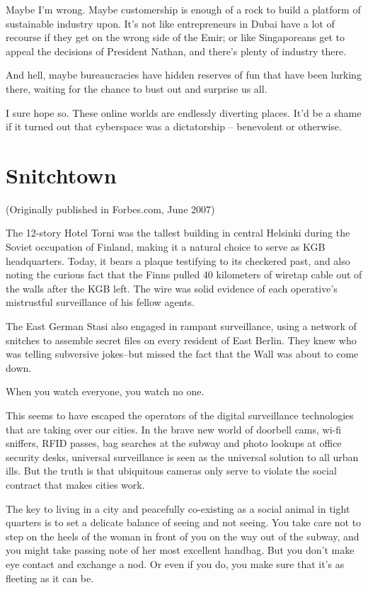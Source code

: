 Maybe I'm wrong. Maybe customership is enough of a rock to build a
platform of sustainable industry upon. It's not like entrepreneurs
in Dubai have a lot of recourse if they get on the wrong side of
the Emir; or like Singaporeans get to appeal the decisions of
President Nathan, and there's plenty of industry there.

And hell, maybe bureaucracies have hidden reserves of fun that have
been lurking there, waiting for the chance to bust out and surprise
us all.

I sure hope so. These online worlds are endlessly diverting places.
It'd be a shame if it turned out that cyberspace was a dictatorship
-- benevolent or otherwise.

\section{Snitchtown}

(Originally published in Forbes.com, June 2007)

The 12-story Hotel Torni was the tallest building in central
Helsinki during the Soviet occupation of Finland, making it a
natural choice to serve as KGB headquarters. Today, it bears a
plaque testifying to its checkered past, and also noting the
curious fact that the Finns pulled 40 kilometers of wiretap cable
out of the walls after the KGB left. The wire was solid evidence of
each operative's mistrustful surveillance of his fellow agents.

The East German Stasi also engaged in rampant surveillance, using a
network of snitches to assemble secret files on every resident of
East Berlin. They knew who was telling subversive jokes--but missed
the fact that the Wall was about to come down.

When you watch everyone, you watch no one.

This seems to have escaped the operators of the digital
surveillance technologies that are taking over our cities. In the
brave new world of doorbell cams, wi-fi sniffers, RFID passes, bag
searches at the subway and photo lookups at office security desks,
universal surveillance is seen as the universal solution to all
urban ills. But the truth is that ubiquitous cameras only serve to
violate the social contract that makes cities work.

The key to living in a city and peacefully co-existing as a social
animal in tight quarters is to set a delicate balance of seeing and
not seeing. You take care not to step on the heels of the woman in
front of you on the way out of the subway, and you might take
passing note of her most excellent handbag. But you don't make eye
contact and exchange a nod. Or even if you do, you make sure that
it's as fleeting as it can be.

